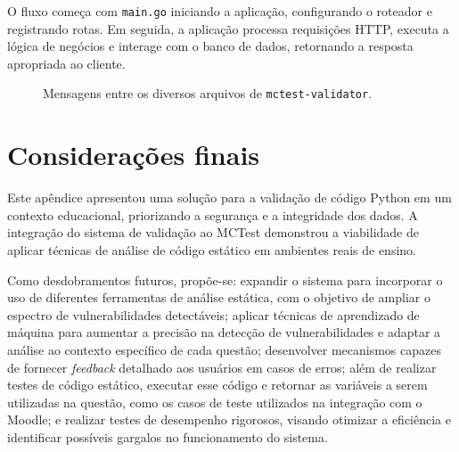 O fluxo começa com \texttt{main.go} iniciando a aplicação, configurando o roteador e registrando rotas. Em seguida, a aplicação processa requisições HTTP, executa a lógica de negócios e interage com o banco de dados, retornando a resposta apropriada ao cliente.


\begin{figure}[h!]%
    \centering%
    \caption{Mensagens entre os diversos arquivos de \texttt{mctest-validator}.}
    \label{fig:plantuml}
\end{figure}%


\section{Considerações finais}

Este apêndice apresentou uma solução para a validação de código Python em um contexto educacional, priorizando a segurança e a integridade dos dados. A integração do sistema de validação ao MCTest demonstrou a viabilidade de aplicar técnicas de análise de código estático em ambientes reais de ensino.

Como desdobramentos futuros, propõe-se: expandir o sistema para incorporar o uso de diferentes ferramentas de análise estática, com o objetivo de ampliar o espectro de vulnerabilidades detectáveis; aplicar técnicas de aprendizado de máquina para aumentar a precisão na detecção de vulnerabilidades e adaptar a análise ao contexto específico de cada questão; desenvolver mecanismos capazes de fornecer \textit{feedback} detalhado aos usuários em casos de erros; além de realizar testes de código estático, executar esse código e retornar as variáveis a serem utilizadas na questão, como os casos de teste utilizados na integração com o Moodle; e realizar testes de desempenho rigorosos, visando otimizar a eficiência e identificar possíveis gargalos no funcionamento do sistema.




